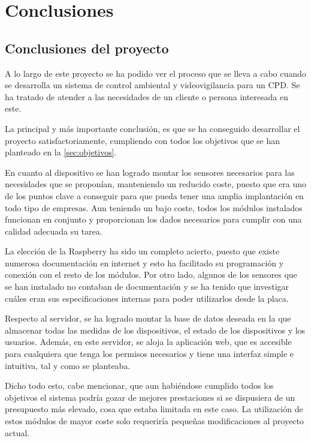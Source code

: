 \chapter{Conclusiones}
\label{ch:conclusiones}
\section{Conclusiones del proyecto}\label{sec:conclusiones-del-proyecto}
A lo largo de este proyecto se ha podido ver el proceso que se lleva a cabo cuando se desarrolla un sistema de control ambiental y videovigilancia para un CPD. Se ha tratado de atender a las necesidades de un cliente o persona interesada en este.

La principal y más importante conclusión, es que se ha conseguido desarrollar el proyecto satisfactoriamente, cumpliendo con todos los objetivos que se han planteado en la \autoref{sec:objetivos}.

En cuanto al dispositivo se han logrado montar los sensores necesarios para las necesidades que se proponían, manteniendo un reducido coste, puesto que era uno de los puntos clave a conseguir para que pueda tener una amplia implantación en todo tipo de empresas. Aun teniendo un bajo coste, todos los módulos instalados funcionan en conjunto y proporcionan los dados necesarios para cumplir con una calidad adecuada su tarea.

La elección de la Raspberry ha sido un completo acierto, puesto que existe numerosa documentación en internet y esto ha facilitado su programación y conexión con el resto de los módulos. Por otro lado, algunos de los sensores que se han instalado no contaban de documentación y se ha tenido que investigar cuáles eran sus especificaciones internas para poder utilizarlos desde la placa.

Respecto al servidor, se ha logrado montar la base de datos deseada en la que almacenar todas las medidas de los dispositivos, el estado de los dispositivos y los usuarios. Además, en este servidor, se aloja la aplicación web, que es accesible para cualquiera que tenga los permisos necesarios y tiene una interfaz simple e intuitiva, tal y como se planteaba.

Dicho todo esto, cabe mencionar, que aun habiéndose cumplido todos los objetivos el sistema podría gozar de mejores prestaciones si se dispusiera de un presupuesto más elevado, cosa que estaba limitada en este caso. La utilización de estos módulos de mayor coste solo requeriría pequeñas modificaciones al proyecto actual.

